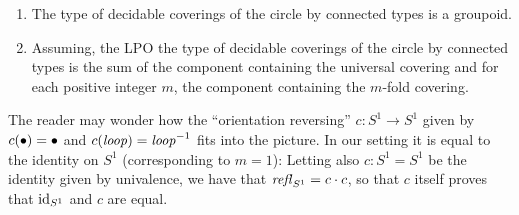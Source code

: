 \begin{lemma}
  \label{lem:componentsofcoversofS1}
  \begin{enumerate}
  \item The type of decidable coverings of the circle by connected types is a groupoid.
  \item Assuming, the LPO the type of decidable coverings of the circle by connected types is the sum of the component containing the universal covering and for each positive integer $m$, the component containing the $m$-fold covering.
  \end{enumerate}

\end{lemma}





\begin{remark}
  \label{rem:flipthecircle}
  The reader may wonder how the ``orientation reversing'' $c:S^1\to S^1$ given by $c(\bullet)=\bullet$ and $c(\mathit{loop})=\mathit{loop}^{-1}$ fits into the picture.  In our setting it is equal to the identity on $S^1$ (corresponding to $m=1$): Letting also $c:S^1=S^1$ be the identity given by univalence, we have that $\mathop{{\it refl}_{S^1}}=c\cdot c$, so that $c$ itself proves that $\mathord{\mathrm{id}}_{S^1}$ and $c$ are equal.
\end{remark}



